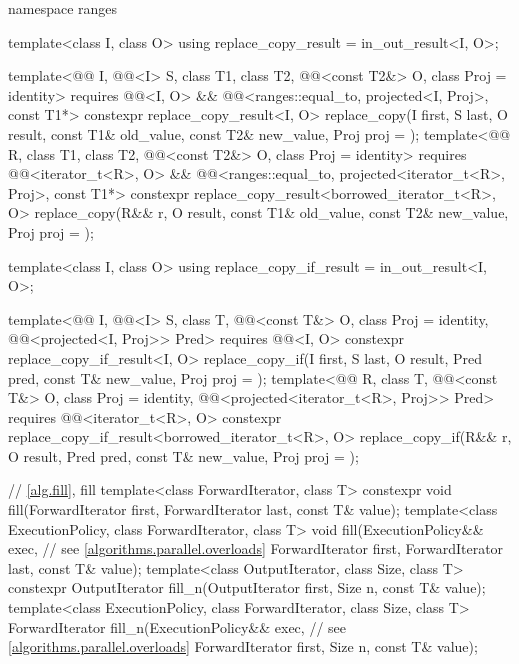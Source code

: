\begin{codeblock}
{  namespace ranges {
    template<class I, class O>
      using replace_copy_result = in_out_result<I, O>;

    template<@@ I, @@<I> S, class T1, class T2,
             @@<const T2&> O, class Proj = identity>
      requires @@<I, O> &&
               @@<ranges::equal_to, projected<I, Proj>, const T1*>
      constexpr replace_copy_result<I, O>
        replace_copy(I first, S last, O result, const T1& old_value, const T2& new_value,
                     Proj proj = {});
    template<@@ R, class T1, class T2, @@<const T2&> O,
             class Proj = identity>
      requires @@<iterator_t<R>, O> &&
               @@<ranges::equal_to,
                                         projected<iterator_t<R>, Proj>, const T1*>
      constexpr replace_copy_result<borrowed_iterator_t<R>, O>
        replace_copy(R&& r, O result, const T1& old_value, const T2& new_value,
                     Proj proj = {});

    template<class I, class O>
      using replace_copy_if_result = in_out_result<I, O>;

    template<@@ I, @@<I> S, class T, @@<const T&> O,
             class Proj = identity, @@<projected<I, Proj>> Pred>
      requires @@<I, O>
      constexpr replace_copy_if_result<I, O>
        replace_copy_if(I first, S last, O result, Pred pred, const T& new_value,
                        Proj proj = {});
    template<@@ R, class T, @@<const T&> O, class Proj = identity,
             @@<projected<iterator_t<R>, Proj>> Pred>
      requires @@<iterator_t<R>, O>
      constexpr replace_copy_if_result<borrowed_iterator_t<R>, O>
        replace_copy_if(R&& r, O result, Pred pred, const T& new_value,
                        Proj proj = {});
  }

  // \ref{alg.fill}, fill
  template<class ForwardIterator, class T>
    constexpr void fill(ForwardIterator first, ForwardIterator last, const T& value);
  template<class ExecutionPolicy, class ForwardIterator, class T>
    void fill(ExecutionPolicy&& exec,                           // see \ref{algorithms.parallel.overloads}
              ForwardIterator first, ForwardIterator last, const T& value);
  template<class OutputIterator, class Size, class T>
    constexpr OutputIterator fill_n(OutputIterator first, Size n, const T& value);
  template<class ExecutionPolicy, class ForwardIterator,
           class Size, class T>
    ForwardIterator fill_n(ExecutionPolicy&& exec,              // see \ref{algorithms.parallel.overloads}
                           ForwardIterator first, Size n, const T& value);

}
\end{codeblock}
